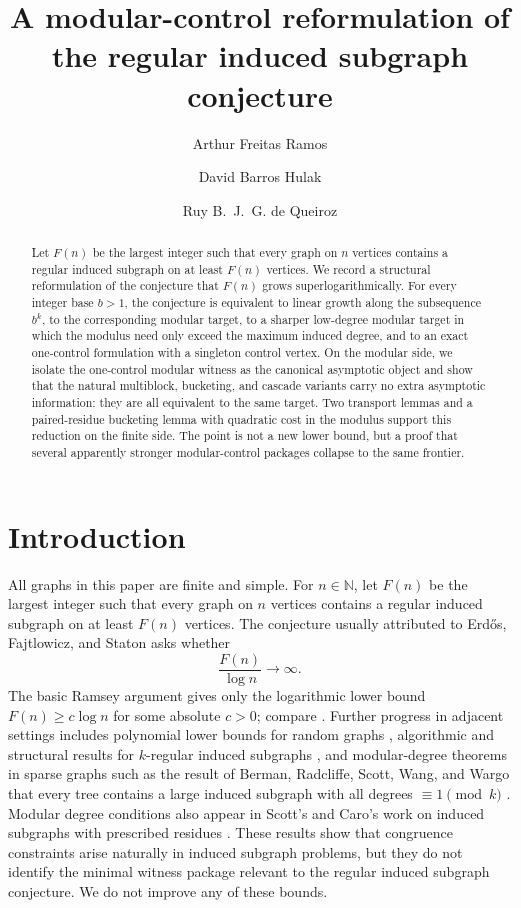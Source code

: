 \documentclass[11pt]{amsart}
\title[Modular-control reformulation]{A modular-control reformulation of the regular induced subgraph conjecture}
\author[A.~F.~Ramos]{Arthur Freitas Ramos}
\author[D.~B.~Hulak]{David Barros Hulak}
\author[R.~de Queiroz]{Ruy B.~J.~G. de Queiroz}
\theoremstyle{definition}
\newcommand{\N}{\mathbb{N}}
\begin{document}
\begin{abstract}
Let $F(n)$ be the largest integer such that every graph on $n$ vertices contains a regular induced
subgraph on at least $F(n)$ vertices. We record a structural reformulation of the conjecture that
$F(n)$ grows superlogarithmically. For every integer base $b>1$, the conjecture is equivalent to
linear growth along the subsequence $b^k$, to the corresponding modular target, to a sharper
low-degree modular target in which the modulus need only exceed the maximum induced degree, and to
an exact one-control formulation with a singleton control vertex. On the modular side, we isolate
the one-control modular witness as the canonical asymptotic object and show that the natural
multiblock, bucketing, and cascade variants carry no extra asymptotic information: they are all
equivalent to the same target. Two transport lemmas and a paired-residue bucketing lemma with
quadratic cost in the modulus support this reduction on the finite side. The point is not a new
lower bound, but a proof that several apparently stronger modular-control packages collapse to the
same frontier.
\end{abstract}

\maketitle

\section{Introduction}

All graphs in this paper are finite and simple. For $n \in \N$, let $F(n)$ be the largest integer
such that every graph on $n$ vertices contains a regular induced subgraph on at least $F(n)$
vertices. The conjecture usually attributed to Erd\H{o}s, Fajtlowicz, and Staton asks whether
\[
  \frac{F(n)}{\log n} \longrightarrow \infty .
\]
The basic Ramsey argument gives only the logarithmic lower bound $F(n) \ge c \log n$ for some
absolute $c>0$; compare \cite{FajtlowiczMcColganReidStaton,AlonKrivelevichSudakov}. Further
progress in adjacent settings includes polynomial lower bounds for random graphs
\cite{KrivelevichSudakovWormald}, algorithmic and structural results for $k$-regular induced
subgraphs \cite{CardosoKaminskiLozin}, and modular-degree theorems in sparse graphs such as
the result of Berman, Radcliffe, Scott, Wang, and Wargo that every tree contains a large induced
subgraph with all degrees $\equiv 1 \pmod k$ \cite{BermanRadcliffeScottWangWargo}. Modular degree
conditions also appear in Scott's and Caro's work on induced subgraphs with prescribed residues
\cite{Scott,Caro}. These results show that congruence constraints arise naturally in induced
subgraph problems, but they do not identify the minimal witness package relevant to the regular
induced subgraph conjecture. We do not improve any of these bounds.
\end{document}
